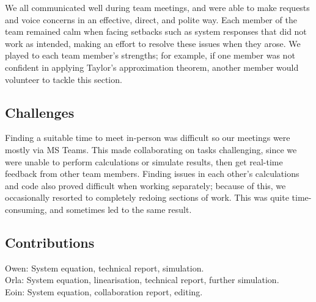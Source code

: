 \documentclass[a4paper,10pt,reqno]{amsart}
\numberwithin{equation}{section}
\begin{document}
We all communicated well during team meetings, and were able to make requests and voice concerns in an effective, direct, and polite way. Each member of the team remained calm when facing setbacks such as system responses that did not work as intended, making an effort to resolve these issues when they arose. We played to each team member’s strengths; for example, if one member was not confident in applying Taylor’s approximation theorem, another member would volunteer to tackle this section.

\subsection{Challenges}

Finding a suitable time to meet in-person was difficult so our meetings were mostly via MS Teams. This made collaborating on tasks challenging, since we were unable to perform calculations or simulate results, then get real-time feedback from other team members. Finding issues in each other’s calculations and code also proved difficult when working separately; because of this, we occasionally resorted to completely redoing sections of work. This was quite time-consuming, and sometimes led to the same result.

\subsection{Contributions}
Owen: System equation, technical report, simulation. \\
Orla: System equation, linearisation, technical report, further simulation. \\
Eoin: System equation, collaboration report, editing.
\end{document}
